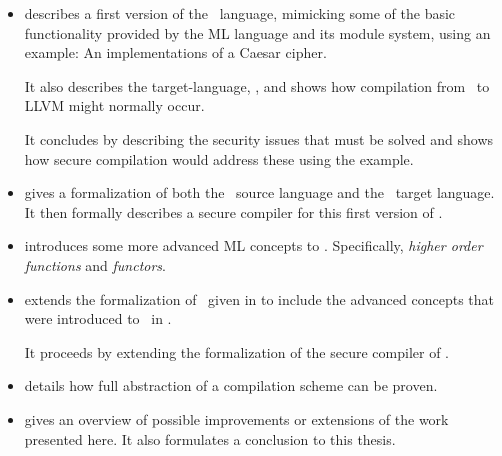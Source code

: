 \begin{itemize}
\item 
{} describes a first version of the \MiniML\ language, mimicking some of the basic functionality provided by the ML language and its module system, using an example: An implementations of a Caesar cipher.

It also describes the target-language, \LLVMIR, and shows how compilation from \MiniML\ to LLVM might normally occur.

It concludes by describing the security issues that must be solved and shows how secure compilation would address these using the example.

\item
{} gives a formalization of both the \MiniML\ source language and the \LLVMIR\ target language.
It then formally describes a secure compiler for this first version of \MiniML.

\item
{} introduces some more advanced ML concepts to \MiniML.
Specifically, \emph{higher order functions} and \emph{functors}.

\item
{} extends the formalization of \MiniML\ given in  to include the advanced concepts that were introduced to \MiniML\ in .

It proceeds by extending the formalization of the secure compiler of .

\item
{} details how full abstraction of a compilation scheme can be proven.

\item
{} gives an overview of possible improvements or extensions of the work presented here.
It also formulates a conclusion to this thesis.
\end{itemize}
